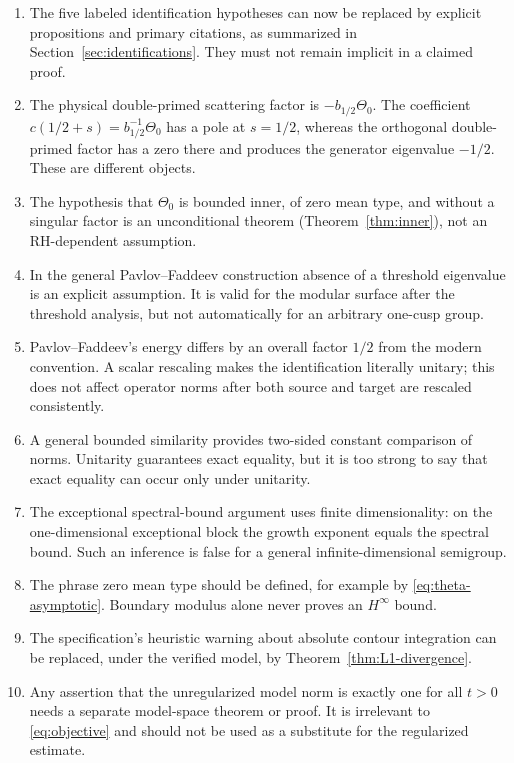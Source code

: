 \documentclass[11pt]{amsart}
\theoremstyle{definition}
\theoremstyle{remark}
\begin{document}
\begin{enumerate}[label=\textup{(S\arabic*)},leftmargin=*]
 \item The five labeled identification hypotheses can now be replaced by
 explicit propositions and primary citations, as summarized in
 Section~\ref{sec:identifications}.  They must not remain implicit in a
 claimed proof.

 \item The physical double-primed scattering factor is
 $-b_{1/2}\Theta_0$.  The coefficient $c(1/2+s)=b_{1/2}^{-1}\Theta_0$ has a
 pole at $s=1/2$, whereas the orthogonal double-primed factor has a zero there
 and produces the generator eigenvalue $-1/2$.  These are different objects.

 \item The hypothesis that $\Theta_0$ is bounded inner, of zero mean type,
 and without a singular factor is an unconditional theorem
 (Theorem~\ref{thm:inner}), not an RH-dependent assumption.

 \item In the general Pavlov--Faddeev construction absence of a threshold
 eigenvalue is an explicit assumption.  It is valid for the modular surface
 after the threshold analysis, but not automatically for an arbitrary
 one-cusp group.

 \item Pavlov--Faddeev's energy differs by an overall factor $1/2$ from the
 modern convention.  A scalar rescaling makes the identification literally
 unitary; this does not affect operator norms after both source and target are
 rescaled consistently.

 \item A general bounded similarity provides two-sided constant comparison of
 norms.  Unitarity guarantees exact equality, but it is too strong to say that
 exact equality can occur only under unitarity.

 \item The exceptional spectral-bound argument uses finite dimensionality:
 on the one-dimensional exceptional block the growth exponent equals the
 spectral bound.  Such an inference is false for a general
 infinite-dimensional semigroup.

 \item The phrase zero mean type should be defined, for example by
 \eqref{eq:theta-asymptotic}.  Boundary modulus alone never proves an
 $H^\infty$ bound.

 \item The specification's heuristic warning about absolute contour
 integration can be replaced, under the verified model, by
 Theorem~\ref{thm:L1-divergence}.

 \item Any assertion that the unregularized model norm is exactly one for all
 $t>0$ needs a separate model-space theorem or proof.  It is irrelevant to
 \eqref{eq:objective} and should not be used as a substitute for the
 regularized estimate.
\end{enumerate}
\end{document}
